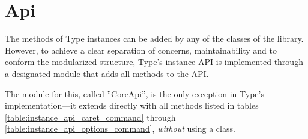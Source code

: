 

\section{Api}



The methods of Type instances can be added by any of the classes of the library. However, to achieve a clear separation of concerns, maintainability and to conform the modularized structure, Type's instance API is implemented through a designated module that adds all methods to the API.

The module for this, called ''CoreApi'', is the only exception in Type's implementation---it extends  directly with all methods listed in tables \ref{table:instance_api_caret_command} through \ref{table:instance_api_options_command}, \textit{without} using a class.



